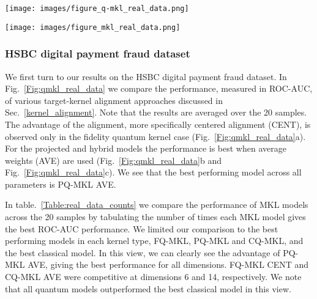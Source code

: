 \documentclass[reprint,amsfonts, amssymb, amsmath,  showkeys, nofootinbib,pra, superscriptaddress, twocolumn,longbibliography]{revtex4-2}
\begin{document}
\begin{figure*}
\centering
    \texttt{[image: images/figure\_q-mkl\_real\_data.png]}
    \caption{\label{Fig:qmkl_real_data} 
    The average test ROC-AUC are plotted for MKL models built using the kernel-target alignment schemes discussed in Sec.~\ref{kernel_alignment}, AVE, SDP, CENT and PROJ. The result is averaged over 20 samples. (a) Fidelity (FQ-MKL), (b) projected (PQ-MKL) and (c) hybrid (CQ-MKL) kernels were employed in our analysis. ROC-AUC is plotted for different number of qubits, n qubits, or feature dimensions. HSBC digital payment fraud dataset is used.
    }
\end{figure*}
\begin{figure*}
\centering
    \texttt{[image: images/figure\_mkl\_real\_data.png]}
    \caption{\label{Fig:mkl_real_data} 
    (a) ROC-AUC of a quantum model, PQ-MKL AVE, is compared with a classical model (C-MKL CENT) and representative single learner models for the HSBC digital payment fraud dataset. For the single learners, Single (Q) employed a ZZ-feature map with $\alpha=0.4$, repetition of $1$ and the linear entanglement scheme, and a radial basis function (RBF) with default length is used in Single (C). Single (Q) Opt is obtained by tuning the hyper-parameter with the parameters of quantum MKL. (b) Variance and (c) mean of kernel matrix used to build the SVM models in (a) are plotted. 
    }
\end{figure*}


\subsubsection{HSBC digital payment fraud dataset}

We first turn to our results on the HSBC digital payment fraud dataset. 
In Fig.~\ref{Fig:qmkl_real_data} we compare the performance, measured in ROC-AUC, of various target-kernel alignment approaches discussed in Sec.~\ref{kernel_alignment}. Note that the results are averaged over the 20 samples.
The advantage of the alignment, more specifically centered alignment (CENT), is observed only in the fidelity quantum kernel case (Fig.~\ref{Fig:qmkl_real_data}a). For the projected and hybrid models the performance is best when average weights (AVE) are used (Fig.~\ref{Fig:qmkl_real_data}b and Fig.~\ref{Fig:qmkl_real_data}c). We see that the best performing model across all parameters is PQ-MKL AVE.

In table.~\ref{Table:real_data_counts} we compare the performance of MKL models across the 20 samples by tabulating the number of times each MKL model gives the best ROC-AUC performance. We limited our comparison to the best performing models in each kernel type, FQ-MKL, PQ-MKL and CQ-MKL, and the best classical model. In this view, we can clearly see the advantage of PQ-MKL AVE, giving the best performance for all dimensions. FQ-MKL CENT and CQ-MKL AVE were competitive at dimensions 6 and 14, respectively. We note that all quantum models outperformed the best classical model in this view.
\end{document}
